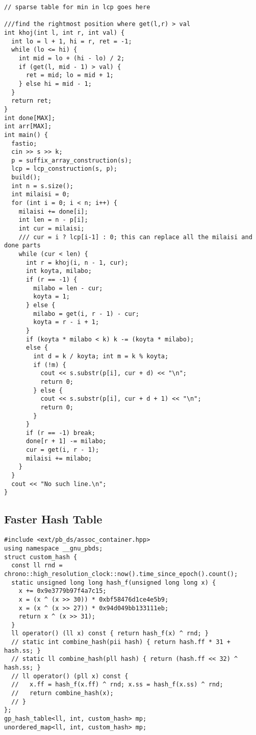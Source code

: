 \documentclass[10pt,a4paper,onesided]{article}
\begin{document}
\begin{multicols*}{3}
\begin{lstlisting}
// sparse table for min in lcp goes here

///find the rightmost position where get(l,r) > val
int khoj(int l, int r, int val) {
  int lo = l + 1, hi = r, ret = -1;
  while (lo <= hi) {
    int mid = lo + (hi - lo) / 2;
    if (get(l, mid - 1) > val) {
      ret = mid; lo = mid + 1;
    } else hi = mid - 1;
  }
  return ret;
}
int done[MAX];
int arr[MAX];
int main() {
  fastio;
  cin >> s >> k;
  p = suffix_array_construction(s);
  lcp = lcp_construction(s, p);
  build();
  int n = s.size();
  int milaisi = 0;
  for (int i = 0; i < n; i++) {
    milaisi += done[i];
    int len = n - p[i];
    int cur = milaisi;
    /// cur = i ? lcp[i-1] : 0; this can replace all the milaisi and done parts
    while (cur < len) {
      int r = khoj(i, n - 1, cur);
      int koyta, milabo;
      if (r == -1) {
        milabo = len - cur;
        koyta = 1;
      } else {
        milabo = get(i, r - 1) - cur;
        koyta = r - i + 1;
      }
      if (koyta * milabo < k) k -= (koyta * milabo);
      else {
        int d = k / koyta; int m = k % koyta;
        if (!m) {
          cout << s.substr(p[i], cur + d) << "\n";
          return 0;
        } else {
          cout << s.substr(p[i], cur + d + 1) << "\n";
          return 0;
        }
      }
      if (r == -1) break;
      done[r + 1] -= milabo;
      cur = get(i, r - 1);
      milaisi += milabo;
    }
  }
  cout << "No such line.\n";
}
\end{lstlisting}
\subsection{Faster Hash Table}
\begin{lstlisting}
#include <ext/pb_ds/assoc_container.hpp>
using namespace __gnu_pbds;
struct custom_hash {
  const ll rnd = chrono::high_resolution_clock::now().time_since_epoch().count();
  static unsigned long long hash_f(unsigned long long x) {
    x += 0x9e3779b97f4a7c15;
    x = (x ^ (x >> 30)) * 0xbf58476d1ce4e5b9;
    x = (x ^ (x >> 27)) * 0x94d049bb133111eb;
    return x ^ (x >> 31);
  }
  ll operator() (ll x) const { return hash_f(x) ^ rnd; }
  // static int combine_hash(pii hash) { return hash.ff * 31 + hash.ss; }
  // static ll combine_hash(pll hash) { return (hash.ff << 32) ^ hash.ss; }
  // ll operator() (pll x) const { 
  //   x.ff = hash_f(x.ff) ^ rnd; x.ss = hash_f(x.ss) ^ rnd;
  //   return combine_hash(x); 
  // }
};
gp_hash_table<ll, int, custom_hash> mp;
unordered_map<ll, int, custom_hash> mp;
\end{lstlisting}

\end{multicols*}
\end{document}
